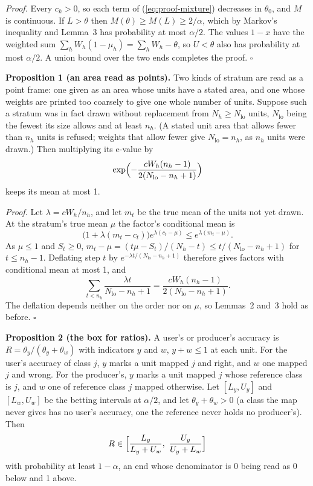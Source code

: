 \documentclass[11pt,a4paper]{article}
\begin{document}
\textit{Proof.} Every $c_k > 0$, so each term of (\ref{eq:proof-mixture}) decreases in $\theta_0$, and $M$ is
continuous. If $L > \theta$ then $M(\theta) \ge M(L) \ge 2/\alpha$, which by Markov's inequality and Lemma~3 has
probability at most $\alpha/2$. The values $1 - x$ have the weighted sum
$\sum_h W_h (1 - \mu_h) = \sum_h W_h - \theta$, so $U < \theta$ also has probability at most $\alpha/2$. A union
bound over the two ends completes the proof. $\square$

\textbf{Proposition 1 (an area read as points).} Two kinds of stratum are read as a point frame: one given as an
area whose units have a stated area, and one whose weights are printed too coarsely to give one whole number of
units. Suppose such a stratum was in fact drawn without replacement from $N_h \ge N_{\mathrm{lo}}$ units,
$N_{\mathrm{lo}}$ being the fewest its size allows and at least $n_h$. (A stated unit area that allows fewer than
$n_h$ units is refused; weights that allow fewer give $N_{\mathrm{lo}} = n_h$, as $n_h$ units were drawn.) Then
multiplying its e-value by
\[
  \exp\Bigl(-\frac{c W_h (n_h - 1)}{2 (N_{\mathrm{lo}} - n_h + 1)}\Bigr)
\]
keeps its mean at most 1.

\textit{Proof.} Let $\lambda = c W_h / n_h$, and let $m_t$ be the true mean of the units not yet drawn. At the
stratum's true mean $\mu$ the factor's conditional mean is
\[
  \bigl(1 + \lambda(m_t - c_t)\bigr) e^{\lambda(c_t - \mu)} \le e^{\lambda (m_t - \mu)}.
\]
As $\mu \le 1$ and $S_t \ge 0$, $m_t - \mu = (t\mu - S_t)/(N_h - t) \le t/(N_{\mathrm{lo}} - n_h + 1)$ for
$t \le n_h - 1$. Deflating step $t$ by $e^{-\lambda t/(N_{\mathrm{lo}} - n_h + 1)}$ therefore gives factors with
conditional mean at most 1, and
\[
  \sum_{t < n_h} \frac{\lambda t}{N_{\mathrm{lo}} - n_h + 1} = \frac{c W_h (n_h - 1)}{2 (N_{\mathrm{lo}} - n_h + 1)}.
\]
The deflation depends neither on the order nor on $\mu$, so Lemmas~2 and~3 hold as before. $\square$

\textbf{Proposition 2 (the box for ratios).} A user's or producer's accuracy is $R = \theta_y / (\theta_y + \theta_w)$
with indicators $y$ and $w$, $y + w \le 1$ at each unit. For the user's accuracy of class $j$, $y$ marks a unit
mapped $j$ and right, and $w$ one mapped $j$ and wrong. For the producer's, $y$ marks a unit mapped $j$ whose
reference class is $j$, and $w$ one of reference class $j$ mapped otherwise. Let $[L_y, U_y]$ and $[L_w, U_w]$ be
the betting intervals at $\alpha/2$, and let $\theta_y + \theta_w > 0$ (a class the map never gives has no user's
accuracy, one the reference never holds no producer's). Then
\[
  R \in \Bigl[\frac{L_y}{L_y + U_w},\ \frac{U_y}{U_y + L_w}\Bigr]
\]
with probability at least $1 - \alpha$, an end whose denominator is 0 being read as 0 below and 1 above.
\end{document}

